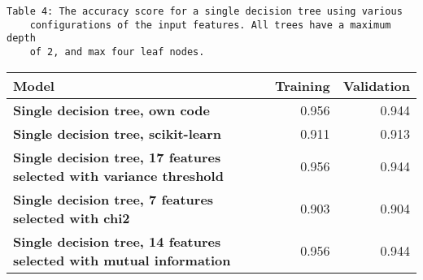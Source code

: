 \documentclass[11pt]{article}
\begin{document}
\begin{Verbatim}[commandchars=\\\{\}]
	Table 4: The accuracy score for a single decision tree using various 
	configurations of the input features. All trees have a maximum depth 
	of 2, and max four leaf nodes.
\end{Verbatim}

\begin{table}[h!]
	\begin{center}
		\label{tab:table1}
		\begin{tabular}{l|r|r}
			\textbf{Model}                                                      		   & \textbf{Training} & \textbf{Validation}
			\\ \hline
			\textbf{Single decision tree, own code}                                        & 0.956         & 0.944               \\ \hline
			\textbf{Single decision tree, scikit-learn}                                    & 0.911         & 0.913               \\ \hline
			\textbf{Single decision tree, 17 features selected with variance threshold}    & 0.956         & 0.944               \\ \hline
			\textbf{Single decision tree, 7 features selected with chi2}                   & 0.903         & 0.904               \\ \hline
			\textbf{Single decision tree, 14 features selected with mutual information}    & 0.956         & 0.944               \\ \hline
		\end{tabular}
	\end{center}
\end{table}
\end{document}
